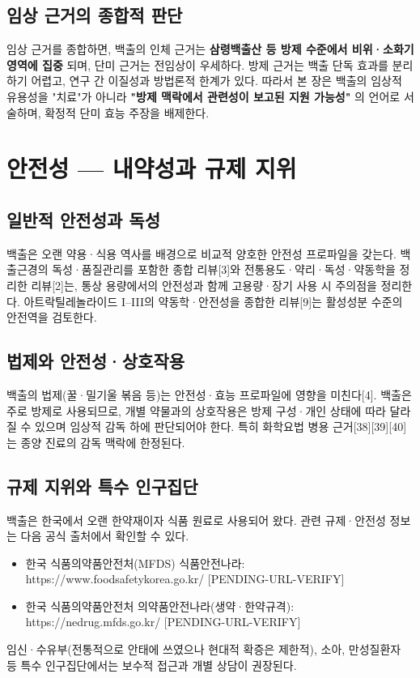 \documentclass[11pt,oneside]{book}
\begin{document}
\subsection{임상 근거의 종합적 판단}
임상 근거를 종합하면, 백출의 인체 근거는 \textbf{삼령백출산 등 방제 수준에서 비위·소화기 영역에 집중} 되며, 단미 근거는 전임상이 우세하다. 방제 근거는 백출 단독 효과를 분리하기 어렵고, 연구 간 이질성과 방법론적 한계가 있다. 따라서 본 장은 백출의 임상적 유용성을 "치료"가 아니라 \textbf{"방제 맥락에서 관련성이 보고된 지원 가능성"} 의 언어로 서술하며, 확정적 단미 효능 주장을 배제한다.

\section{안전성 — 내약성과 규제 지위}
\subsection{일반적 안전성과 독성}
백출은 오랜 약용·식용 역사를 배경으로 비교적 양호한 안전성 프로파일을 갖는다. 백출근경의 독성·품질관리를 포함한 종합 리뷰[3]와 전통용도·약리·독성·약동학을 정리한 리뷰[2]는, 통상 용량에서의 안전성과 함께 고용량·장기 사용 시 주의점을 정리한다. 아트락틸레놀라이드 I–III의 약동학·안전성을 종합한 리뷰[9]는 활성성분 수준의 안전역을 검토한다.

\subsection{법제와 안전성·상호작용}
백출의 법제(꿀·밀기울 볶음 등)는 안전성·효능 프로파일에 영향을 미친다[4]. 백출은 주로 방제로 사용되므로, 개별 약물과의 상호작용은 방제 구성·개인 상태에 따라 달라질 수 있으며 임상적 감독 하에 판단되어야 한다. 특히 화학요법 병용 근거[38][39][40]는 종양 진료의 감독 맥락에 한정된다.

\subsection{규제 지위와 특수 인구집단}
백출은 한국에서 오랜 한약재이자 식품 원료로 사용되어 왔다. 관련 규제·안전성 정보는 다음 공식 출처에서 확인할 수 있다.

\begin{itemize}[leftmargin=6mm,itemsep=1pt,topsep=2pt]
  \item 한국 식품의약품안전처(MFDS) 식품안전나라: https://www.foodsafetykorea.go.kr/ [PENDING-URL-VERIFY]
  \item 한국 식품의약품안전처 의약품안전나라(생약·한약규격): https://nedrug.mfds.go.kr/ [PENDING-URL-VERIFY]
\end{itemize}
임신·수유부(전통적으로 안태에 쓰였으나 현대적 확증은 제한적), 소아, 만성질환자 등 특수 인구집단에서는 보수적 접근과 개별 상담이 권장된다.
\end{document}
